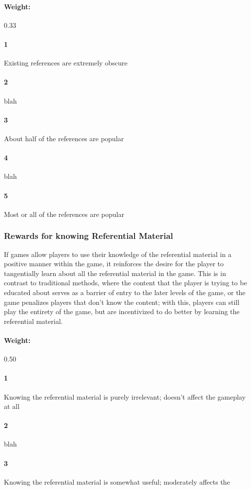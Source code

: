 \paragraph{Weight:}{0.33}\paragraph{1}Existing references are extremely obscure\paragraph{2}blah\paragraph{3}About half of the references are popular\paragraph{4}blah\paragraph{5}Most or all of the references are popular\subsubsection{Rewards for knowing Referential Material}{If games allow players to use their knowledge of the referential material in a positive manner within the game, it reinforces the desire for the player to tangentially learn about all the referential material in the game. This is in contrast to traditional methods, where the content that the player is trying to be educated about serves as a barrier of entry to the later levels of the game, or the game penalizes players that don't know the content; with this, players can still play the entirety of the game, but are incentivized to do better by learning the referential material.} \paragraph{Weight:}{0.50}\paragraph{1}Knowing the referential material is purely irrelevant; doesn’t affect the gameplay at all\paragraph{2}blah\paragraph{3}Knowing the referential material is somewhat useful; moderately affects the 